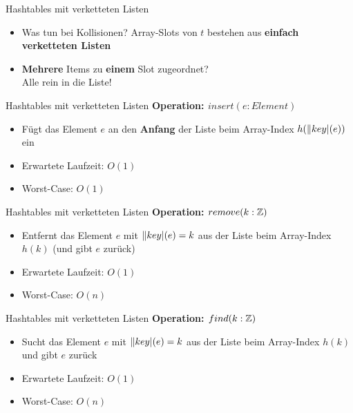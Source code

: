 \begin{frame}{Hashtables mit verketteten Listen}
	\begin{itemize}
		\item Was tun bei Kollisionen?
		\pause
		\implitem Array-Slots von $t$ bestehen aus \textbf{einfach verketteten Listen} \pause
		\item \textbf{Mehrere} Items zu \textbf{einem} Slot zugeordnet? \\
		Alle rein in die Liste!
	\end{itemize}
\end{frame}


\begin{frame}{Hashtables mit verketteten Listen}
	\textbf{Operation: $insert(e : Element)$} \\[0,125cm]
	\begin{itemize}
		\item Fügt das Element $e$ an den \textbf{Anfang} der Liste beim Array-Index $h(\|key|(e))$ ein
		\pause
		\item Erwartete Laufzeit: $O(1)$
		\item Worst-Case: $O(1)$
	\end{itemize}
\end{frame}

\begin{frame}{Hashtables mit verketteten Listen}
	\textbf{Operation: $remove(k : \mathbb{Z})$} \\[0,125cm]
	\begin{itemize}
		\item Entfernt das Element $e$ mit $\|key|(e) = k$ aus der Liste beim Array-Index $h(k)$ (und gibt $e$ zurück)
		\pause
		\item Erwartete Laufzeit: $O(1)$
		\item Worst-Case: $O(n)$
	\end{itemize}
\end{frame}

\begin{frame}{Hashtables mit verketteten Listen}
	\textbf{Operation: $find(k : \mathbb{Z})$} \\[0,125cm]
	\begin{itemize}
		\item Sucht das Element $e$ mit $\|key|(e) = k$ aus der Liste beim Array-Index $h(k)$ und gibt $e$ zurück
		\pause
		\item Erwartete Laufzeit: $O(1)$
		\item Worst-Case: $O(n)$
	\end{itemize}
\end{frame}


